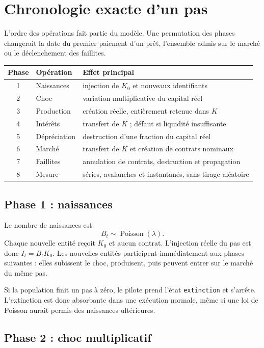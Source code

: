 \documentclass[11pt,a4paper]{article}
\newcommand{\code}[1]{\texttt{#1}}
\begin{document}
\section{Chronologie exacte d'un pas}

L'ordre des opérations fait partie du modèle. Une permutation des phases
changerait la date du premier paiement d'un prêt, l'ensemble admis sur le
marché ou le déclenchement des faillites.

\begin{center}
\begin{tabularx}{\textwidth}{@{}clX@{}}
\toprule
Phase & Opération & Effet principal \\
\midrule
1 & Naissances & injection de $K_0$ et nouveaux identifiants \\
2 & Choc & variation multiplicative du capital réel \\
3 & Production & création réelle, entièrement retenue dans $K$ \\
4 & Intérêts & transfert de $K$ ; défaut si liquidité insuffisante \\
5 & Dépréciation & destruction d'une fraction du capital réel \\
6 & Marché & transfert de $K$ et création de contrats nominaux \\
7 & Faillites & annulation de contrats, destruction et propagation \\
8 & Mesure & séries, avalanches et instantanés, sans tirage aléatoire \\
\bottomrule
\end{tabularx}
\end{center}

\subsection{Phase 1 : naissances}

Le nombre de naissances est
\[
B_t\sim\operatorname{Poisson}(\lambda).
\]
Chaque nouvelle entité reçoit $K_0$ et aucun contrat. L'injection réelle du
pas est donc $I_t=B_tK_0$. Les nouvelles entités participent immédiatement
aux phases suivantes : elles subissent le choc, produisent, puis peuvent
entrer sur le marché du même pas.

Si la population finit un pas à zéro, le pilote prend l'état
\code{extinction} et s'arrête. L'extinction est donc absorbante dans une
exécution normale, même si une loi de Poisson aurait permis des naissances
ultérieures.

\subsection{Phase 2 : choc multiplicatif}
\end{document}
